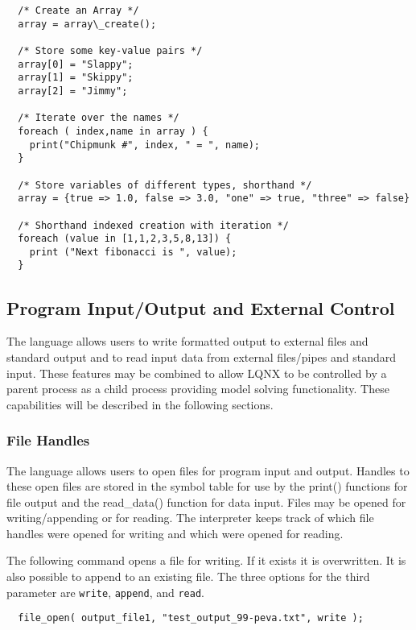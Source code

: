 \lstset{language=LQX}
\begin{lstlisting}  
  /* Create an Array */
  array = array\_create();
  
  /* Store some key-value pairs */
  array[0] = "Slappy";
  array[1] = "Skippy";
  array[2] = "Jimmy";
  
  /* Iterate over the names */
  foreach ( index,name in array ) {
    print("Chipmunk #", index, " = ", name);
  }
  
  /* Store variables of different types, shorthand */
  array = {true => 1.0, false => 3.0, "one" => true, "three" => false}
  
  /* Shorthand indexed creation with iteration */
  foreach (value in [1,1,2,3,5,8,13]) {
    print ("Next fibonacci is ", value);
  }
\end{lstlisting}

\subsection{Program Input/Output and External Control}

The \ModLang language allows users to write formatted output to external files and standard output and to read
input data from external files/pipes and standard input. These features may be combined to allow LQNX to be
controlled by a parent process as a child process providing model solving functionality. These capabilities will
be described in the following sections.

\subsubsection{File Handles}

The \ModLang language allows users to open files for program input and output. Handles to these
open files are stored in the symbol table for use by the print() functions for file output and the
read\_data() function for data input. Files may be opened for writing/appending or for reading.
The \ModLang interpreter keeps track of which file handles were opened for writing and which
were opened for reading.

The following command opens a file for writing. If it exists it is overwritten. It is also possible
to append to an existing file. The three options for the third parameter are {\tt write}, {\tt append}, and {\tt read}.

\lstset{language=LQX}
\begin{lstlisting}
  file_open( output_file1, "test_output_99-peva.txt", write );
\end{lstlisting}

